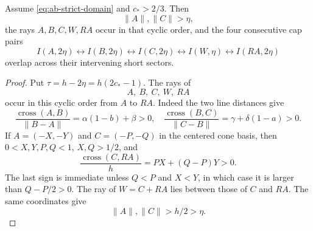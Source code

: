 \begin{proposition}
\label{prop:technical-four-overlaps}
Assume \eqref{eq:ab-strict-domain} and $c_*>2/3$.  Then
\[
 \lVert A\rVert,\lVert C\rVert>\eta,
\]
the rays $A,B,C,W,RA$ occur in that cyclic order, and the four consecutive
cap pairs
\[
 I(A,2\eta)\leftrightarrow I(B,2\eta)
 \leftrightarrow I(C,2\eta)\leftrightarrow I(W,\eta)
 \leftrightarrow I(RA,2\eta)
\]
overlap across their intervening short sectors.
\end{proposition}

\begin{proof}

Put $\tau=h-2\eta=h(2c_*-1)$.  The rays of
\begin{equation}
 A,\ B,\ C,\ W,\ RA                              \label{eq:cap-ray-order}
\end{equation}
occur in this cyclic order from $A$ to $RA$.  Indeed the two line distances
give
\[
 \frac{\operatorname{cross}(A,B)}{\lVert B-A\rVert}
 =\alpha(1-b)+\beta>0,
 \quad
 \frac{\operatorname{cross}(B,C)}{\lVert C-B\rVert}
 =\gamma+\delta(1-a)>0.
\]
If $A=(-X,-Y)$ and $C=(-P,-Q)$ in the centered cone basis, then
$0<X,Y,P,Q<1$, $X,Q>1/2$, and
\[
 \frac{\operatorname{cross}(C,RA)}h=PX+(Q-P)Y>0.
\]
The last sign is immediate unless $Q<P$ and $X<Y$, in which case it is
larger than $Q-P/2>0$.  The ray of $W=C+RA$ lies between those of $C$ and
$RA$.  The same coordinates give
\begin{equation}
 \lVert A\rVert,\lVert C\rVert>h/2>\eta.         \label{eq:outer-radii}
\end{equation}


\end{proof}
